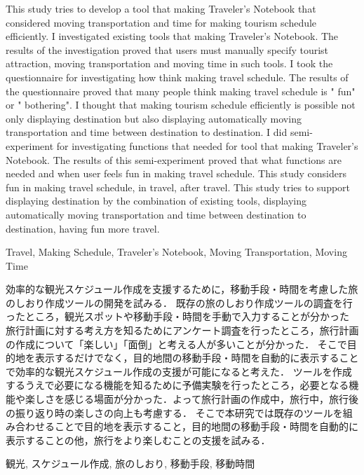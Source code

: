 \documentclass{funthesis}
\begin{document}
\maketitle       %

\begin{eabstract}
This study tries to develop a tool that making Traveler's Notebook that considered moving transportation and time for making tourism schedule efficiently.
I investigated existing tools that making Traveler's Notebook. The results of the investigation proved that users must manually specify tourist attraction, moving transportation and moving time in such tools.
I took the questionnaire for investigating how think making travel schedule. The results of the questionnaire proved that many people think making travel schedule is " fun" or " bothering".
I thought that making tourism schedule efficiently is possible not only displaying destination but also displaying automatically moving transportation and time between destination to destination.
I did semi-experiment for investigating functions that needed for tool that making Traveler's Notebook. The results of this semi-experiment proved that what functions are needed and when user feels fun in making travel schedule. This study considers fun in making travel schedule, in travel, after travel.
This study tries to support displaying destination by the combination of existing tools, displaying automatically moving transportation and time between destination to destination, having fun more travel.



\end{eabstract}

\begin{ekeyword}
Travel, Making Schedule, Traveler's Notebook, Moving Transportation, Moving Time
\end{ekeyword}

\begin{jabstract}
効率的な観光スケジュール作成を支援するために，移動手段・時間を考慮した旅のしおり作成ツールの開発を試みる．
既存の旅のしおり作成ツールの調査を行ったところ，観光スポットや移動手段・時間を手動で入力することが分かった
旅行計画に対する考え方を知るためにアンケート調査を行ったところ，旅行計画の作成について「楽しい」「面倒」と考える人が多いことが分かった．
そこで目的地を表示するだけでなく，目的地間の移動手段・時間を自動的に表示することで効率的な観光スケジュール作成の支援が可能になると考えた．
ツールを作成するうえで必要になる機能を知るために予備実験を行ったところ，必要となる機能や楽しさを感じる場面が分かった．よって旅行計画の作成中，旅行中，旅行後の振り返り時の楽しさの向上も考慮する．
そこで本研究では既存のツールを組み合わせることで目的地を表示すること，目的地間の移動手段・時間を自動的に表示することの他，旅行をより楽しむことの支援を試みる．




\end{jabstract}

\begin{jkeyword}
観光, スケジュール作成, 旅のしおり, 移動手段, 移動時間
\end{jkeyword}
\end{document}
